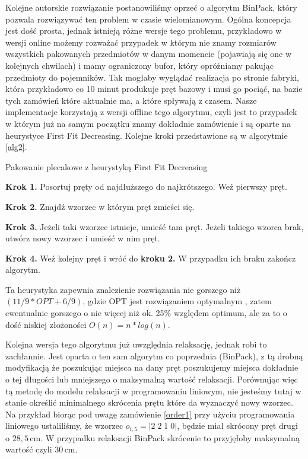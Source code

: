 Kolejne autorskie rozwiązanie postanowiliśmy oprzeć o algorytm BinPack, który pozwala rozwiązywać ten problem w czasie wielomianowym. Ogólna koncepcja jest dość prosta, jednak istnieją różne wersje tego problemu, przykładowo w wersji online możemy rozważać przypadek w którym nie znamy rozmiarów wszystkich pakowanych przedmiotów w danym momencie (pojawiają się one w kolejnych chwilach) i mamy ograniczony bufor, który opróżniamy pakując przedmioty do pojemników. Tak mogłaby wyglądać realizacja po stronie fabryki, która przykładowo co 10 minut produkuje pręt bazowy i musi go pociąć, na bazie tych zamówień które aktualnie ma, a które spływają z czasem. Nasze implementacje korzystają z wersji offline tego algorytmu, czyli jest to przypadek w którym już na samym początku znamy dokładnie zamówienie i są oparte na heurystyce First Fit Decreasing. Kolejne kroki przedstawione są w algorytmie \ref{alg2}.
\begin{algorithm}[!t]
\raggedright
\caption{Pakowanie plecakowe z heurystyką First Fit Decreasing}
\label{alg2}
\textbf{Krok 1.} Posortuj pręty od najdłuższego do najkrótszego. Weź pierwszy pręt.
\smallskip

\textbf{Krok 2.} Znajdź wzorzec w którym pręt zmieści się.
\smallskip

\textbf{Krok 3.} Jeżeli taki wzorzec istnieje, umieść tam pręt. Jeżeli takiego wzorca brak, utwórz nowy wzorzec i umieść w nim pręt.
\smallskip

\textbf{Krok 4.} Weź kolejny pręt i wróć do \textbf{kroku 2.} W przypadku ich braku zakończ algorytm.
\end{algorithm}
Ta heurystyka zapewnia znalezienie rozwiązania nie gorszego niż \((11/9*OPT + 6/9)\), gdzie OPT jest rozwiązaniem optymalnym \cite{bin-packing-optimal}, zatem ewentualnie gorszego o nie więcej niż ok. 25\% względem optimum, ale za to o dość niskiej złożoności $O(n) = n * log(n)$.

Kolejna wersja tego algorytmu już uwzględnia relaksację, jednak robi to zachłannie. Jest oparta o ten sam algorytm co poprzednia (BinPack), z tą drobną modyfikacją że poszukując miejsca na dany pręt poszukujemy miejsca dokładnie o tej długości lub mniejszego o maksymalną wartość relaksacji. Porównując więc tą metodę do modelu relaksacji w programowaniu liniowym, nie jesteśmy tutaj w stanie określić minimalnego skrócenia prętu które da wyznaczyć nowy wzorzec. Na przykład biorąc pod uwagę zamówienie \ref{order1} przy użyciu programowania liniowego ustaliliśmy, że wzorzec \(o_{i,5} = |2 \; 2 \; 1 \; 0|\), będzie miał skrócony pręt drugi o \(28{,}5 \, \text{cm}\). W przypadku relaksacji BinPack skrócenie to przyjęłoby maksymalną wartość czyli \(30 \, \text{cm}\).

